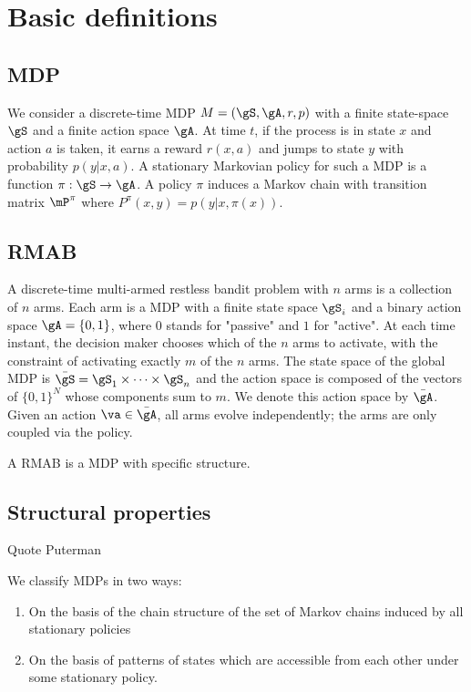 \section{Basic definitions}

\subsection{MDP}

We consider a discrete-time MDP $M=(\gS,\gA,r,p)$ with a finite state-space $\gS$ and a finite action space $\gA$. At time $t$, if the process is in state $x$ and action $a$ is taken, it earns a reward $r(x,a)$ and jumps to state $y$ with probability $p(y|x,a)$. A stationary Markovian policy for such a MDP is a function $\pi:\gS\to\gA$. A policy $\pi$ induces a Markov chain with transition matrix $\mP^\pi$ where $P^\pi(x,y) = p(y | x, \pi(x))$. 

\subsection{RMAB}

A discrete-time multi-armed restless bandit problem with $n$ arms is a collection of $n$ arms. Each arm is a MDP with a finite state space $\gS_i$ and a binary action space $\gA=\{0,1\}$, where $0$ stands for "passive" and $1$ for "active". At each time instant, the decision maker chooses which of the $n$ arms to activate, with the constraint of activating exactly $m$ of the $n$ arms. The state space of the global MDP is $\bar{\gS} = \gS_1\times\dots\times\gS_n$ and the action space is composed of the vectors of $\{0,1\}^N$ whose components sum to $m$. We denote this action space by $\bar{\gA}$.  Given an action $\va\in\bar{\gA}$, all arms evolve independently; the arms are only coupled via the policy.

A RMAB is a MDP with specific structure. 

\subsection{Structural properties}

Quote Puterman

We classify MDPs in two ways:

\begin{enumerate}
    \item On the basis of the chain structure of the set of Markov chains induced by all stationary policies
    \item On the basis of patterns of states which are accessible from each other under some stationary policy.
\end{enumerate}


